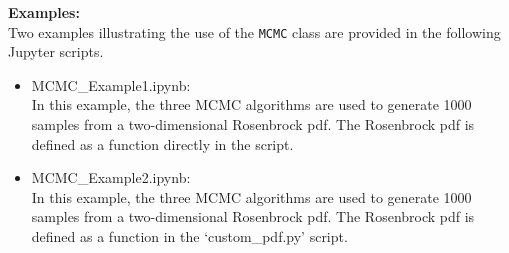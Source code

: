 \noindent\textbf{Examples:}\\
\noindent Two examples illustrating the use of the \texttt{MCMC} class are provided in the following Jupyter scripts.
\begin{itemize}
\item MCMC\_Example1.ipynb:\\
	In this example, the three MCMC algorithms are used to generate 1000 samples from a two-dimensional Rosenbrock pdf. The Rosenbrock pdf is defined as a function directly in the 	script.
\item MCMC\_Example2.ipynb:\\
	In this example, the three MCMC algorithms are used to generate 1000 samples from a two-dimensional Rosenbrock pdf. The Rosenbrock pdf is defined as a function in the 			`custom\_pdf.py' script.
\end{itemize}

%
%

